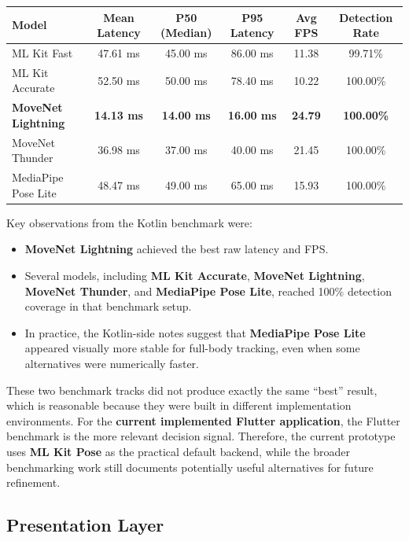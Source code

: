 \documentclass[12pt,a4paper]{article}
\begin{document}
\begin{table}[H]
\centering
\small
\begin{tabularx}{\textwidth}{>{\raggedright\arraybackslash}X c c c c c}
\toprule
\textbf{Model} & \textbf{Mean Latency} & \textbf{P50 (Median)} & \textbf{P95 Latency} & \textbf{Avg FPS} & \textbf{Detection Rate} \\
\midrule
ML Kit Fast & 47.61 ms & 45.00 ms & 86.00 ms & 11.38 & 99.71\% \\
ML Kit Accurate & 52.50 ms & 50.00 ms & 78.40 ms & 10.22 & 100.00\% \\
\textbf{MoveNet Lightning} & \textbf{14.13 ms} & \textbf{14.00 ms} & \textbf{16.00 ms} & \textbf{24.79} & \textbf{100.00\%} \\
MoveNet Thunder & 36.98 ms & 37.00 ms & 40.00 ms & 21.45 & 100.00\% \\
MediaPipe Pose Lite & 48.47 ms & 49.00 ms & 65.00 ms & 15.93 & 100.00\% \\
\bottomrule
\end{tabularx}
\end{table}

Key observations from the Kotlin benchmark were:

\begin{itemize}
    \item \textbf{MoveNet Lightning} achieved the best raw latency and FPS.
    \item Several models, including \textbf{ML Kit Accurate}, \textbf{MoveNet Lightning}, \textbf{MoveNet Thunder}, and \textbf{MediaPipe Pose Lite}, reached 100\% detection coverage in that benchmark setup.
    \item In practice, the Kotlin-side notes suggest that \textbf{MediaPipe Pose Lite} appeared visually more stable for full-body tracking, even when some alternatives were numerically faster.
\end{itemize}

These two benchmark tracks did not produce exactly the same ``best'' result, which is reasonable because they were built in different implementation environments. For the \textbf{current implemented Flutter application}, the Flutter benchmark is the more relevant decision signal. Therefore, the current prototype uses \textbf{ML Kit Pose} as the practical default backend, while the broader benchmarking work still documents potentially useful alternatives for future refinement.

\subsection{Presentation Layer}
\end{document}
